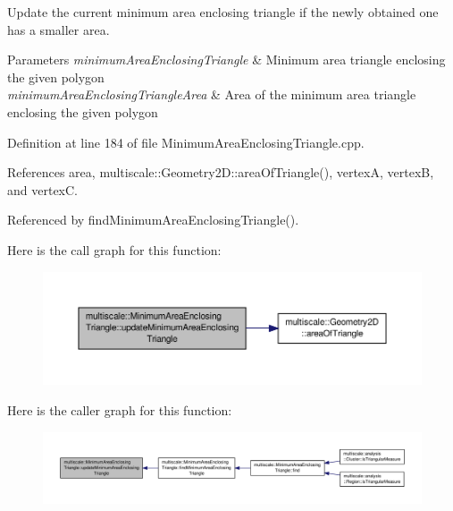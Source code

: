 Update the current minimum area enclosing triangle if the newly obtained one has a smaller area. 


\begin{DoxyParams}{Parameters}
{\em minimum\-Area\-Enclosing\-Triangle} & Minimum area triangle enclosing the given polygon \\
\hline
{\em minimum\-Area\-Enclosing\-Triangle\-Area} & Area of the minimum area triangle enclosing the given polygon \\
\hline
\end{DoxyParams}


Definition at line 184 of file Minimum\-Area\-Enclosing\-Triangle.\-cpp.



References area, multiscale\-::\-Geometry2\-D\-::area\-Of\-Triangle(), vertex\-A, vertex\-B, and vertex\-C.



Referenced by find\-Minimum\-Area\-Enclosing\-Triangle().



Here is the call graph for this function\-:\nopagebreak
\begin{figure}[H]
\begin{center}
\leavevmode
\includegraphics[width=350pt]{classmultiscale_1_1MinimumAreaEnclosingTriangle_a13a71a75863ff3ccc9993e741086dbcf_cgraph}
\end{center}
\end{figure}




Here is the caller graph for this function\-:\nopagebreak
\begin{figure}[H]
\begin{center}
\leavevmode
\includegraphics[width=350pt]{classmultiscale_1_1MinimumAreaEnclosingTriangle_a13a71a75863ff3ccc9993e741086dbcf_icgraph}
\end{center}
\end{figure}


